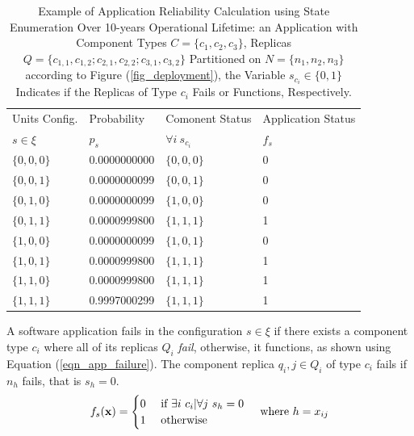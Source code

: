 \begin{table}
	\centering
	\begin{tabular}{@{}llll@{}}
		\toprule
		Units Config. & Probability & Comonent Status & Application Status \\ 
		$s\in\xi$   & $p_s$     & $\forall i\ s_{c_i}$ & $f_s$ \\ \midrule
		$\{0,0,0\}$ & 0.0000000000 & $\{0, 0, 0\}$        & 0     \\
		$\{0,0,1\}$ & 0.0000000099 & $\{0, 0, 1\}$         & 0     \\
		$\{0,1,0\}$ & 0.0000000099 & $\{1, 0, 0\}$          & 0     \\
		$\{0,1,1\}$  & 0.0000999800 & $\{1, 1, 1\}$         & 1     \\
		$\{1,0,0\}$ & 0.0000000099 &$\{1, 0, 1\}$         & 0    \\
		$\{1,0,1\}$ & 0.0000999800 & $\{1, 1, 1\}$        & 1     \\
		$\{1,1,0\}$ & 0.0000999800 & $\{1, 1, 1\}$          & 1     \\
		$\{1,1,1\}$ & 0.9997000299 & $\{1, 1, 1\}$           & 1     \\ \bottomrule
	\end{tabular}
	\caption{Example of Application Reliability Calculation using State Enumeration Over 10-years Operational Lifetime: an Application with Component Types $C=\{c_1,c_2,c_3\}$, Replicas $Q=\{c_{1,1},c_{1,2};c_{2,1},c_{2,2};c_{3,1},c_{3,2}\}$ Partitioned on $N=\{n_1,n_2,n_3\}$ according to Figure (\ref{fig_deployment}), the Variable $s_{c_i}\in\{0,1\}$ Indicates if the Replicas of Type $c_i$ Fails or Functions, Respectively.}
	\label{tbl_application_rel}
\end{table}

\begin{definition}
A software application fails in the configuration $s\in\xi$ if there exists a component type $c_i$ where all of its replicas $Q_i$ \textit{fail}, otherwise, it functions, as shown using Equation (\ref{eqn_app_failure}).  The component replica $q_i,j\in Q_i$ of type $c_i$ fails if $n_h$ fails, that is $s_h=0$.
\begin{align}
\label{eqn_app_failure}
f_s(\textbf{x})&= 
\begin{cases}
0 & \mbox{ if } \exists i\ c_i|\forall j\ s_h=0\\
1 & \mbox{ otherwise }
\end{cases}&\mbox{ where }h=x_{ij}
\end{align}
\end{definition}

